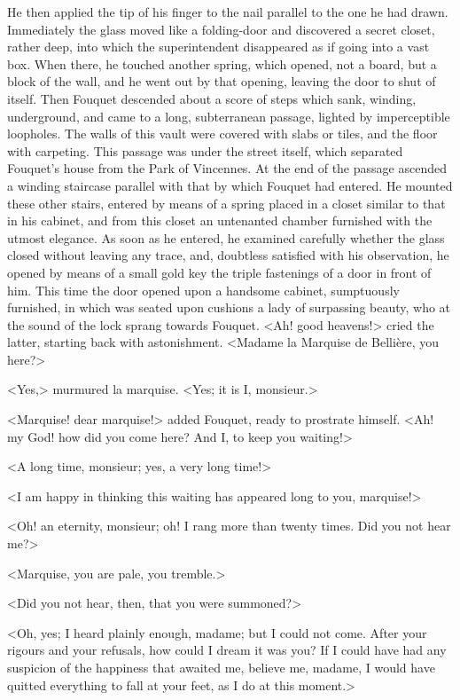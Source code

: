 He then applied the tip of his finger to the nail parallel to the one he had drawn. Immediately the glass moved like a folding-door and discovered a secret closet, rather deep, into which the superintendent disappeared as if going into a vast box. When there, he touched another spring, which opened, not a board, but a block of the wall, and he went out by that opening, leaving the door to shut of itself. Then Fouquet descended about a score of steps which sank, winding, underground, and came to a long, subterranean passage, lighted by imperceptible loopholes. The walls of this vault were covered with slabs or tiles, and the floor with carpeting. This passage was under the street itself, which separated Fouquet's house from the Park of Vincennes. At the end of the passage ascended a winding staircase parallel with that by which Fouquet had entered. He mounted these other stairs, entered by means of a spring placed in a closet similar to that in his cabinet, and from this closet an untenanted chamber furnished with the utmost elegance. As soon as he entered, he examined carefully whether the glass closed without leaving any trace, and, doubtless satisfied with his observation, he opened by means of a small gold key the triple fastenings of a door in front of him. This time the door opened upon a handsome cabinet, sumptuously furnished, in which was seated upon cushions a lady of surpassing beauty, who at the sound of the lock sprang towards Fouquet. <Ah! good heavens!> cried the latter, starting back with astonishment. <Madame la Marquise de Bellière, you here?>

<Yes,> murmured la marquise. <Yes; it is I, monsieur.>

<Marquise! dear marquise!> added Fouquet, ready to prostrate himself. <Ah! my God! how did you come here? And I, to keep you waiting!>

<A long time, monsieur; yes, a very long time!>

<I am happy in thinking this waiting has appeared long to you, marquise!>

<Oh! an eternity, monsieur; oh! I rang more than twenty times. Did you not hear me?>

<Marquise, you are pale, you tremble.>

<Did you not hear, then, that you were summoned?>

<Oh, yes; I heard plainly enough, madame; but I could not come. After your rigours and your refusals, how could I dream it was you? If I could have had any suspicion of the happiness that awaited me, believe me, madame, I would have quitted everything to fall at your feet, as I do at this moment.>

